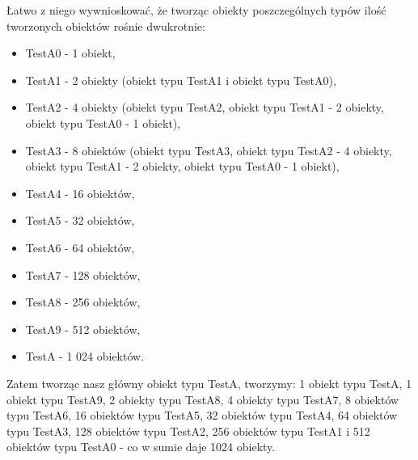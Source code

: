 \documentclass[12pt]{article}
\begin{document}
Łatwo z niego wywnioskować, że tworząc obiekty poszczególnych typów ilość tworzonych obiektów rośnie dwukrotnie:
\begin{itemize}
	\item TestA0 - 1 obiekt,
	\item TestA1 - 2 obiekty (obiekt typu TestA1 i obiekt typu TestA0),
	\item TestA2 - 4 obiekty (obiekt typu TestA2, obiekt typu TestA1 - 2 obiekty, obiekt typu TestA0 - 1 obiekt),
	\item TestA3 - 8 obiektów (obiekt typu TestA3, obiekt typu TestA2 - 4 obiekty, obiekt typu TestA1 - 2 obiekty, obiekt typu TestA0 - 1 obiekt),
	\item TestA4 - 16 obiektów,
	\item TestA5 - 32 obiektów,
	\item TestA6 - 64 obiektów,
	\item TestA7 - 128 obiektów,
	\item TestA8 - 256 obiektów,
	\item TestA9 - 512 obiektów,
	\item TestA - 1 024 obiektów.
\end{itemize}
Zatem tworząc nasz główny obiekt typu TestA, tworzymy: 1 obiekt typu TestA, 1 obiekt typu TestA9, 2 obiekty typu TestA8, 4 obiekty typu TestA7, 8 obiektów typu TestA6, 16 obiektów typu TestA5, 32 obiektów typu TestA4, 64 obiektów typu TestA3, 128 obiektów typu TestA2, 256 obiektów typu TestA1 i 512 obiektów typu TestA0 - co w sumie daje 1024 obiekty.
\end{document}
